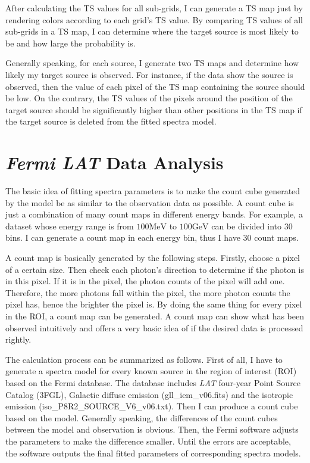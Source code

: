 \documentclass[12pt]{report}
\begin{document}
      After calculating the TS values for all sub-grids, I can generate a TS map just by 
      rendering colors according to each grid's TS value. By comparing TS values of 
      all sub-grids in a TS map, I can determine where the target source is most likely to 
      be and how large the probability is. 
      
      Generally speaking, for each source, I generate two TS maps and determine how likely 
      my target source is observed. For instance, if the data show the source is observed, 
      then the value of each pixel of the TS map containing the source should be low. 
      On the contrary, the TS values of the pixels around the position of the target 
      source should be significantly higher than other positions in the TS map if the target 
      source is deleted from the fitted spectra model.
       
  \section{\textit{Fermi LAT} Data Analysis}
    The basic idea of fitting spectra parameters is to make the count cube generated by 
    the model be as similar to the observation data as possible. A count cube is just a 
    combination of many count maps in different energy bands. For example, a dataset whose 
    energy range is from $100\mbox{MeV}$ to $100\mbox{GeV}$ can be divided into 30 bins. 
    I can generate a count map in each energy bin, thus I have 30 count maps.
    
    A count map is basically generated by the following steps. Firstly, choose a 
    pixel of a certain size. Then check each photon's direction to determine if 
    the photon is in this pixel. If it is in the pixel, the photon counts of the 
    pixel will add one. Therefore, the more photons fall within the pixel, the more 
    photon counts the pixel has, hence the brighter the pixel is. By doing the same 
    thing for every pixel in the ROI, a count map can be generated. A count map can show 
    what has been observed intuitively and offers a very basic idea of if 
    the desired data is processed rightly.
          
    The calculation process can be summarized as follows. First of all, I have to generate 
    a spectra model for every known source in the region of interest (ROI) based on the Fermi 
    database. The database includes \textit{LAT} four-year Point Source Catalog (3FGL), 
    Galactic diffuse emission (gll\_iem\_v06.fits) and the isotropic emission 
    (iso\_P8R2\_SOURCE\_V6\_v06.txt). Then I can produce a count cube based on the 
    model. Generally speaking, the differences of the count cubes between the model and 
    observation is obvious. Then, the Fermi software adjusts the parameters 
    to make the difference smaller. Until the errors are acceptable, the software 
    outputs the final fitted parameters of corresponding spectra models.    
\end{document}
